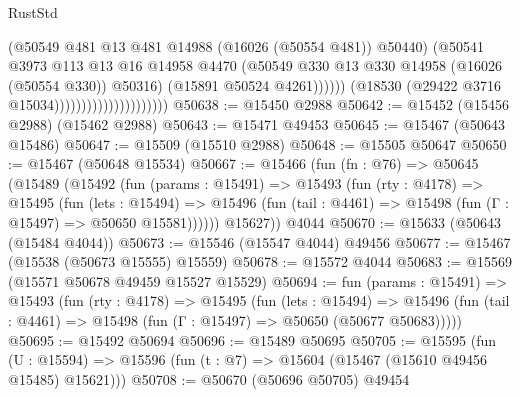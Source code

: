 \begin{lexlean}{RustStd}
\begin{coremodule}
                                                  (@50549
                                                    @481
                                                    @13
                                                    @481
                                                    @14988
                                                    (@16026 (@50554 @481))
                                                    @50440)
                                                  (@50541
                                                    @3973
                                                    @113
                                                    @13
                                                    @16
                                                    @14958
                                                    @4470
                                                    (@50549
                                                      @330
                                                      @13
                                                      @330
                                                      @14958
                                                      (@16026 (@50554 @330))
                                                      @50316)
                                                    (@15891 @50524 @4261))))))
                                          (@18530 (@29422 @3716 @15034)))))))))))))))))))))
@50638 := @15450 @2988
@50642 := @15452 (@15456 @2988) (@15462 @2988)
@50643 := @15471 @49453
@50645 := @15467 (@50643 @15486)
@50647 := @15509 (@15510 @2988)
@50648 := @15505 @50647
@50650 := @15467 (@50648 @15534)
@50667 := @15466
    (fun (fn : @76) =>
    @50645
      (@15489
        (@15492
          (fun (params : @15491) =>
          @15493
            (fun (rty : @4178) =>
            @15495
              (fun (lets : @15494) =>
              @15496 (fun (tail : @4461) => @15498 (fun (Γ : @15497) => @50650 @15581))))))
        @15627))
    @4044
@50670 := @15633 (@50643 (@15484 @4044))
@50673 := @15546 (@15547 @4044) @49456
@50677 := @15467 (@15538 (@50673 @15555) @15559)
@50678 := @15572 @4044
@50683 := @15569 (@15571 @50678 @49459 @15527 @15529)
@50694 := fun (params : @15491) =>
  @15493
    (fun (rty : @4178) =>
    @15495
      (fun (lets : @15494) =>
      @15496 (fun (tail : @4461) => @15498 (fun (Γ : @15497) => @50650 (@50677 @50683)))))
@50695 := @15492 @50694
@50696 := @15489 @50695
@50705 := @15595
    (fun (U : @15594) => @15596 (fun (t : @7) => @15604 (@15467 (@15610 @49456 @15485) @15621)))
@50708 := @50670 (@50696 @50705) @49454

\end{coremodule}
\end{lexlean}
